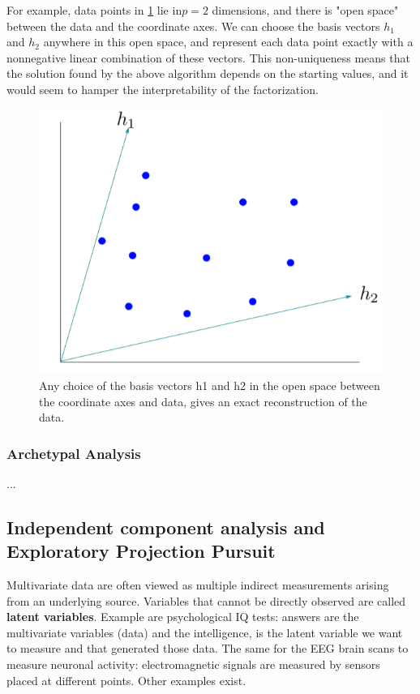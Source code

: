 \documentclass[12pt, letterpaper]{article}
\theoremstyle{definition}
\begin{document}
For example, data points in \ref{nonUnique} lie in$ p = 2$ dimensions, and there is "open space" between the data and the coordinate axes. We can choose the basis vectors $h_1$ and $h_2$ anywhere in this open space, and represent each data point exactly with a nonnegative linear combination of these vectors. This non-uniqueness means that the solution found by the above algorithm depends on the starting values, and it would seem to hamper the interpretability of the factorization.
\begin{figure}
\centering
\includegraphics[scale=0.4]{img/NonUniqueness}
\caption{Any choice of the basis vectors h1 and h2 in the open space between the coordinate axes and data, gives an exact reconstruction of the data.}
\label{nonUnique}
\end{figure}

\subsubsection{Archetypal Analysis}
...

\subsection{Independent component analysis and Exploratory Projection Pursuit}
Multivariate data are often viewed as multiple indirect measurements arising from an underlying source. Variables that cannot be directly observed are called \textbf{latent variables}. Example are psychological IQ tests: answers are the multivariate variables (data) and the intelligence, is the latent variable we want to measure and that generated those data. The same for the EEG brain scans to measure neuronal activity: electromagnetic signals are measured by sensors placed at different points. Other examples exist.
\end{document}
